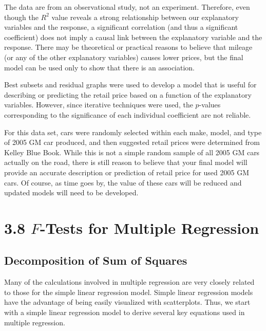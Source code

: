 \documentclass[
]{report}
\theoremstyle{definition}
\theoremstyle{definition}
\theoremstyle{definition}
\theoremstyle{definition}
\theoremstyle{remark}
\begin{document}
The data are from an observational study, not an experiment. Therefore, even though the \(R^2\) value reveals a strong relationship between our explanatory variables and the response, a significant correlation (and thus a significant coefficient) does not imply a causal link between the explanatory variable and the response. There may be theoretical or practical reasons to believe that mileage (or any of the other
explanatory variables) causes lower prices, but the final model can be used only to show that there is an association.

Best subsets and residual graphs were used to develop a model that is useful for describing or predicting the retail price based on a function of the explanatory variables. However, since iterative techniques were used, the \(p\)-values corresponding to the significance of each individual coefficient are not reliable.

For this data set, cars were randomly selected within each make, model, and type of 2005 GM car produced, and then suggested retail prices were determined from Kelley Blue Book. While this is not a simple random sample of all 2005 GM cars actually on the road, there is still reason to believe that your final model will provide an accurate description or prediction of retail price for used 2005 GM cars. Of course, as time goes by, the value of these cars will be reduced and updated models will need to be developed.

\hypertarget{f-tests-for-multiple-regression}{%
\section{\texorpdfstring{3.8 \(F\)-Tests for Multiple Regression}{3.8 F-Tests for Multiple Regression}}\label{f-tests-for-multiple-regression}}

\hypertarget{decomposition-of-sum-of-squares}{%
\subsection{Decomposition of Sum of Squares}\label{decomposition-of-sum-of-squares}}

Many of the calculations involved in multiple regression are very closely related to those for the simple linear regression model. Simple linear regression models have the advantage of being easily visualized with scatterplots. Thus, we start with a simple linear regression model to derive several key equations used in multiple regression.
\end{document}
